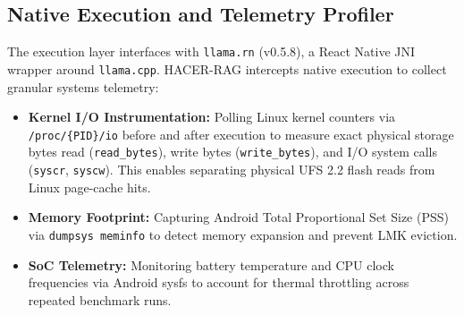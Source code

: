 \subsection{Native Execution and Telemetry Profiler}
The execution layer interfaces with \texttt{llama.rn} (v0.5.8), a React Native JNI wrapper around \texttt{llama.cpp}. HACER-RAG intercepts native execution to collect granular systems telemetry:
\begin{itemize}
    \item \textbf{Kernel I/O Instrumentation:} Polling Linux kernel counters via \texttt{/proc/\{PID\}/io} before and after execution to measure exact physical storage bytes read (\texttt{read\_bytes}), write bytes (\texttt{write\_bytes}), and I/O system calls (\texttt{syscr}, \texttt{syscw}). This enables separating physical UFS 2.2 flash reads from Linux page-cache hits.
    \item \textbf{Memory Footprint:} Capturing Android Total Proportional Set Size (PSS) via \texttt{dumpsys meminfo} to detect memory expansion and prevent LMK eviction.
    \item \textbf{SoC Telemetry:} Monitoring battery temperature and CPU clock frequencies via Android sysfs to account for thermal throttling across repeated benchmark runs.
\end{itemize}
